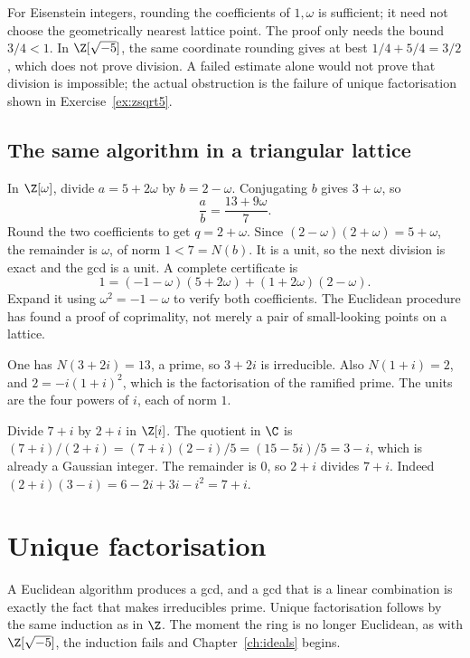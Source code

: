 For Eisenstein integers, rounding the coefficients of $1,\omega$ is sufficient;
it need not choose the geometrically nearest lattice point. The proof only
needs the bound $3/4<1$. In $\Z[\sqrt{-5}]$, the same coordinate rounding gives
at best $1/4+5/4=3/2$, which does not prove division. A failed estimate alone
would not prove that division is impossible; the actual obstruction is the
failure of unique factorisation shown in Exercise~\ref{ex:zsqrt5}.

\subsection*{The same algorithm in a triangular lattice}
In $\Z[\omega]$, divide $a=5+2\omega$ by $b=2-\omega$.
Conjugating $b$ gives $3+\omega$, so
\[
\frac ab=\frac{13+9\omega}{7}.
\]
Round the two coefficients to get $q=2+\omega$. Since
$(2-\omega)(2+\omega)=5+\omega$, the remainder is $\omega$,
of norm $1<7=N(b)$. It is a unit, so the next division is exact
and the gcd is a unit. A complete certificate is
\[
1=(-1-\omega)(5+2\omega)+(1+2\omega)(2-\omega).
\]
Expand it using $\omega^2=-1-\omega$ to verify both coefficients.
The Euclidean procedure has found a proof of coprimality, not merely
a pair of small-looking points on a lattice.

\begin{examplex}
One has $N(3+2i)=13$, a prime, so $3+2i$ is irreducible. Also $N(1+i)=2$, and $2=-i(1+i)^2$, which is the factorisation of the ramified prime. The units are the four powers of $i$, each of norm $1$.
\end{examplex}

\begin{examplex}
Divide $7+i$ by $2+i$ in $\Z[i]$. The quotient in $\C$ is $(7+i)/(2+i)=(7+i)(2-i)/5=(15-5i)/5=3-i$, which is already a Gaussian integer. The remainder is $0$, so $2+i$ divides $7+i$. Indeed $(2+i)(3-i)=6-2i+3i-i^2=7+i$.
\end{examplex}

\section{Unique factorisation}

A Euclidean algorithm produces a gcd, and a gcd that is a linear combination is exactly the fact that makes irreducibles prime. Unique factorisation follows by the same induction as in $\Z$. The moment the ring is no longer Euclidean, as with $\Z[\sqrt{-5}]$, the induction fails and Chapter~\ref{ch:ideals} begins.

